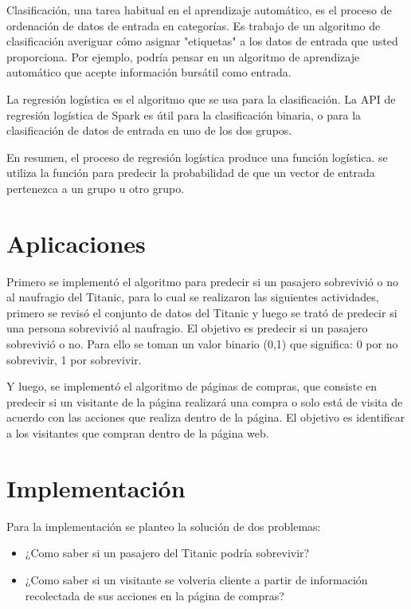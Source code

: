 \documentclass{article}
\begin{document}
Clasificación, una tarea habitual en el aprendizaje automático, es el proceso de ordenación de datos de entrada en categorías. Es trabajo de un algoritmo de clasificación averiguar cómo asignar "etiquetas" a los datos de entrada que usted proporciona. Por ejemplo, podría pensar en un algoritmo de aprendizaje automático que acepte información bursátil como entrada. 

La regresión logística es el algoritmo que se usa para la clasificación. La API de regresión logística de Spark es útil para la clasificación binaria, o para la clasificación de datos de entrada en uno de los dos grupos. 

En resumen, el proceso de regresión logística produce una función logística. se utiliza la función para predecir la probabilidad de que un vector de entrada pertenezca a un grupo u otro grupo.

\section{Aplicaciones}

Primero se implementó el algoritmo para predecir si un pasajero sobrevivió o no al naufragio del Titanic, para lo cual se realizaron las siguientes actividades, primero se revisó el conjunto de datos del Titanic y luego se trató de predecir si una persona sobrevivió al naufragio. El objetivo es predecir si un pasajero sobrevivió o no. Para ello se toman un valor binario (0,1) que significa: 0 por no sobrevivir, 1 por sobrevivir.

Y luego, se implementó el algoritmo de páginas de compras, que consiste en predecir si un visitante de la página realizará una compra o solo está de visita de acuerdo con las acciones que realiza dentro de la página. El objetivo es identificar a los visitantes que compran dentro de la página web.


\section{Implementación}

Para la implementación se planteo la solución de dos problemas:
\begin{itemize}
    \item ¿Como saber si un pasajero del Titanic podría sobrevivir?
    \item ¿Como saber si un visitante se volveria cliente a partir de información recolectada de sus acciones en la página de compras?
\end{itemize}
\end{document}
